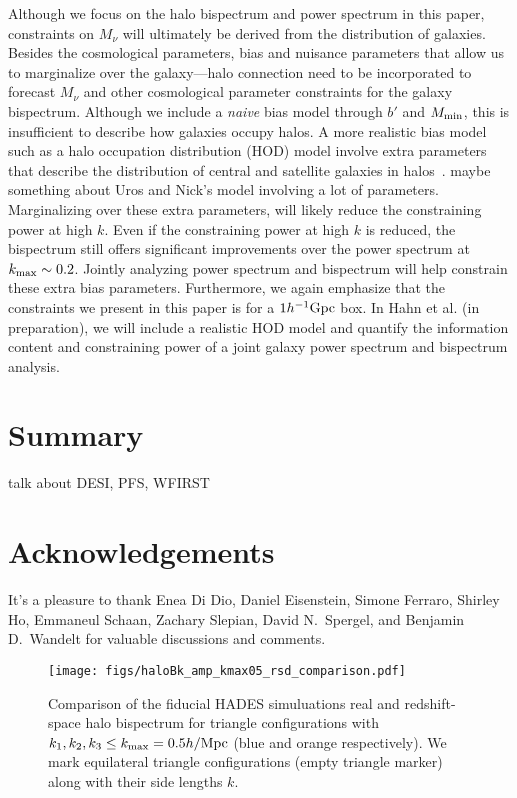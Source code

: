 \documentclass[12pt, letterpaper, preprint]{aastex62}
\newcommand{\smnu}{M_\nu}
\newcommand{\ch}[1]{{\color{orange}{\bf CH:} #1}}
\begin{document}
Although we focus on the halo bispectrum and power spectrum in this paper, 
constraints on $\smnu$ will ultimately be derived from the distribution of 
galaxies. Besides the cosmological parameters, bias and nuisance parameters 
that allow us to marginalize over the galaxy---halo connection need to be
incorporated to forecast $\smnu$ and other cosmological parameter constraints 
for the galaxy bispectrum. Although we include a \emph{naive} bias model 
through $b'$ and $M_{\rm min}$, this is insufficient to describe how galaxies
occupy halos. A more realistic bias model such as a halo occupation distribution 
(HOD) model involve extra parameters that describe the distribution of central 
and satellite galaxies in halos~\citep[\emph{e.g.}][]{zheng2005,leauthaud2012a,tinker2013,zentner2016,vakili2019}. 
\ch{maybe something about Uros and Nick's model involving a lot of parameters.}
Marginalizing over these extra parameters, will likely reduce the constraining 
power at high $k$. Even if the constraining power at high $k$ is reduced, the
bispectrum still offers significant improvements over the power spectrum at 
$k_{\rm max} \sim 0.2$. Jointly analyzing power spectrum and bispectrum will 
help constrain these extra bias parameters. Furthermore, we again emphasize that
the constraints we present in this paper is for a $1h^{-1}{\rm Gpc}$ box. In 
Hahn et al. (in preparation), we will include a realistic HOD model and quantify 
the information content and constraining power of a joint galaxy power spectrum 
and bispectrum analysis. 

\section{Summary} 

\ch{talk about DESI, PFS, WFIRST} 

\section*{Acknowledgements}
It's a pleasure to thank 
    Enea Di Dio, 
    Daniel Eisenstein, 
    Simone Ferraro, 
    Shirley Ho, 
    Emmaneul Schaan, 
    Zachary Slepian, 
    David N.~Spergel, 
    and Benjamin D.~Wandelt
    for valuable discussions and comments. 

\appendix

\begin{figure}
\begin{center}
    \texttt{[image: figs/haloBk\_amp\_kmax05\_rsd\_comparison.pdf]}
    \caption{Comparison of the fiducial HADES simuluations real and redshift-space halo
    bispectrum for triangle configurations with $k_1, k_2, k_3 \leq k_{\rm max} = 0.5 h/{\rm Mpc}$ 
    (blue and orange respectively). We mark equilateral triangle configurations (empty 
    triangle marker) along with their side lengths $k$.
    }
\label{fig:real_vs_rsd}
\end{center}
\end{figure}
\end{document}
